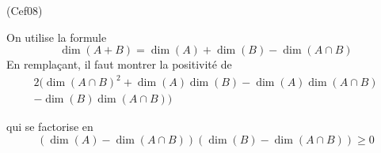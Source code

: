 \begin{tiny}(Cef08)\end{tiny} On utilise la formule
\begin{displaymath}
\dim(A+B) = \dim(A) + \dim(B) - \dim(A\cap B)
\end{displaymath}
En remplaçant, il faut montrer la positivité de
\begin{multline*}
2( \dim(A\cap B)^2 + \dim(A)\dim(B) - \dim(A)\dim(A\cap B) \\ - \dim(B)\dim(A\cap B) )   
\end{multline*}

qui se factorise en
\begin{displaymath}
 (\dim(A) - \dim(A\cap B))(\dim(B) - \dim(A\cap B))\geq 0 
\end{displaymath}
